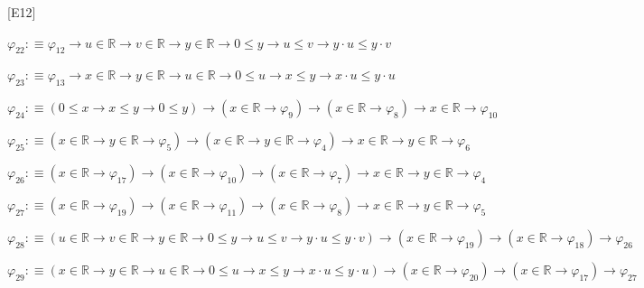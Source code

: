 \begin{fullproof}{[E12]}
\begin{abbrevlist}
\item $\varphi_{22} :\equiv \varphi_{12} \to u \in \mathbb{R} \to v \in \mathbb{R} \to y \in \mathbb{R} \to 0 \leq y \to u \leq v \to y \cdot u \leq y \cdot v$
\item $\varphi_{23} :\equiv \varphi_{13} \to x \in \mathbb{R} \to y \in \mathbb{R} \to u \in \mathbb{R} \to 0 \leq u \to x \leq y \to x \cdot u \leq y \cdot u$
\item $\varphi_{24} :\equiv (0 \leq x \to x \leq y \to 0 \leq y) \to (x \in \mathbb{R} \to \varphi_{9}) \to (x \in \mathbb{R} \to \varphi_{8}) \to x \in \mathbb{R} \to \varphi_{10}$
\item $\varphi_{25} :\equiv (x \in \mathbb{R} \to y \in \mathbb{R} \to \varphi_{5}) \to (x \in \mathbb{R} \to y \in \mathbb{R} \to \varphi_{4}) \to x \in \mathbb{R} \to y \in \mathbb{R} \to \varphi_{6}$
\item $\varphi_{26} :\equiv (x \in \mathbb{R} \to \varphi_{17}) \to (x \in \mathbb{R} \to \varphi_{10}) \to (x \in \mathbb{R} \to \varphi_{7}) \to x \in \mathbb{R} \to y \in \mathbb{R} \to \varphi_{4}$
\item $\varphi_{27} :\equiv (x \in \mathbb{R} \to \varphi_{19}) \to (x \in \mathbb{R} \to \varphi_{11}) \to (x \in \mathbb{R} \to \varphi_{8}) \to x \in \mathbb{R} \to y \in \mathbb{R} \to \varphi_{5}$
\item $\varphi_{28} :\equiv (u \in \mathbb{R} \to v \in \mathbb{R} \to y \in \mathbb{R} \to 0 \leq y \to u \leq v \to y \cdot u \leq y \cdot v) \to (x \in \mathbb{R} \to \varphi_{19}) \to (x \in \mathbb{R} \to \varphi_{18}) \to \varphi_{26}$
\item $\varphi_{29} :\equiv (x \in \mathbb{R} \to y \in \mathbb{R} \to u \in \mathbb{R} \to 0 \leq u \to x \leq y \to x \cdot u \leq y \cdot u) \to (x \in \mathbb{R} \to \varphi_{20}) \to (x \in \mathbb{R} \to \varphi_{17}) \to \varphi_{27}$
\end{abbrevlist}
\end{fullproof}
